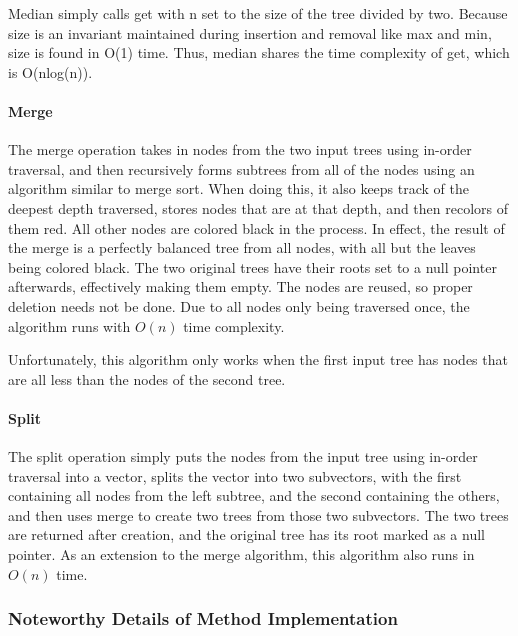 \documentclass{article}
\begin{document}
\noindent
Median simply calls get with n set to the size of the tree divided by two. Because size is an invariant maintained during insertion and removal like max and min, size is found in O(1) time. Thus, median shares the time complexity of get, which is O(nlog(n)).
\\

\paragraph{Merge}

\noindent
The merge operation takes in nodes from the two input trees using in-order traversal, and then recursively forms subtrees from all of the nodes using an algorithm similar to merge sort. When doing this, it also keeps track of the deepest depth traversed, stores nodes that are at that depth, and then recolors of them red. All other nodes are colored black in the process. In effect, the result of the merge is a perfectly balanced tree from all nodes, with all but the leaves being colored black. The two original trees have their roots set to a null pointer afterwards, effectively making them empty. The nodes are reused, so proper deletion needs not be done. Due to all nodes only being traversed once, the algorithm runs with $O(n)$ time complexity.

Unfortunately, this algorithm only works when the first input tree has nodes that are all less than the nodes of the second tree.
\\

\paragraph{Split}

\noindent
The split operation simply puts the nodes from the input tree using in-order traversal into a vector, splits the vector into two subvectors, with the first containing all nodes from the left subtree, and the second containing the others, and then uses merge to create two trees from those two subvectors. The two trees are returned after creation, and the original tree has its root marked as a null pointer. As an extension to the merge algorithm, this algorithm also runs in $O(n)$ time.
\\


\subsubsection{Noteworthy Details of Method Implementation}
\end{document}
